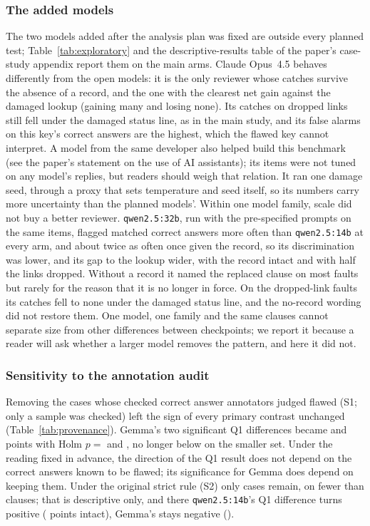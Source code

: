 \subsubsection{The added models}
\label{sec:res-explore}
The two models added after the analysis plan was fixed are outside every planned test; Table~\ref{tab:exploratory}
and the descriptive-results table of the paper's case-study appendix report them on the main arms. Claude Opus~4.5
behaves differently from the open models: it is the only reviewer whose catches survive the absence of a record, and
the one with the clearest net gain against the damaged lookup (gaining many and losing none). Its catches on dropped links still
fell under the damaged status line, as in the main study, and its false alarms on this key's correct answers are
the highest, which the flawed key cannot interpret. A model from the same developer also helped build this
benchmark (see the paper's statement on the use of AI assistants); its items were not tuned on any model's replies,
but readers should weigh that relation. It ran one damage seed, through a
proxy that sets temperature and seed itself, so its numbers carry more uncertainty than the planned models'. Within one model family, scale did not buy a better reviewer. \texttt{qwen2.5:32b}, run with
the pre-specified prompts on the same items, flagged matched correct answers more often than
\texttt{qwen2.5:14b} at every arm, and about twice as often once given the record, so its discrimination was lower, and its gap to the lookup wider, with the record
intact and with half the links dropped. Without a record it named the replaced clause on most faults but rarely for
the reason that it is no longer in force. On the dropped-link faults its catches fell to none under the damaged
status line, and the no-record wording did not restore them. One model, one family and the same \NClauses{} clauses
cannot separate size from other differences between checkpoints; we report it because a reader will ask whether a
larger model removes the pattern, and here it did not.

\subsubsection{Sensitivity to the annotation audit}
\label{sec:res-sens}
Removing the cases whose checked correct answer annotators judged flawed (S1; only a sample was checked) left the sign
of every primary contrast unchanged (Table~\ref{tab:provenance}). Gemma's two significant Q1 differences became
\SOneDiffNetIntactGemma{} and \SOneDiffNetSpuriousTenGemma{} points with Holm $p=$ \SOnePHolmNetIntactGemma{} and
\SOnePHolmNetSpuriousTenGemma, no longer below \Alpha{} on the smaller set. Under the reading fixed in advance, the
direction of the Q1 result does not depend on the correct answers known to be flawed; its significance for Gemma does
depend on keeping them. Under the original strict rule (S2) only \NStrictKept{} cases remain, on fewer than \MinClauses{} clauses; that
is descriptive only, and there \texttt{qwen2.5:14b}'s Q1 difference turns positive (\STwoDiffNetIntactQwenFourteen{}
points intact), Gemma's stays negative (\STwoDiffNetIntactGemma).

